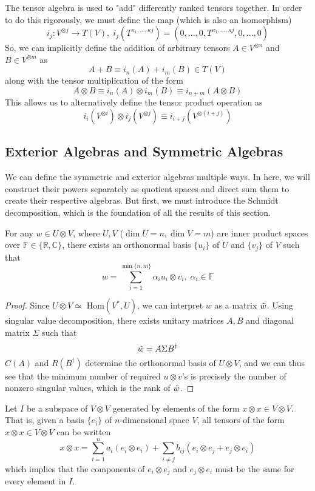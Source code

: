   The tensor algebra is used to "add" differently ranked tensors together. In order to do this rigorously, we must define the map (which is also an isomorphism)
  \[i_j: V^{\otimes j} \longrightarrow T(V), \; i_j (T^{\kappa_1, ..., \kappa j}) = (0, ...,0, T^{\kappa_1, ..., \kappa j}, 0, ..., 0) \]
  So, we can implicitly define the addition of arbitrary tensors $A \in V^{\otimes n}$ and $B \in V^{\otimes m}$ as 
  \[ A + B \equiv i_n (A) + i_m (B) \in T(V)\]
  along with the tensor multiplication of the form
  \[ A \otimes B \equiv i_n(A) \otimes i_m(B) \equiv i_{n+m} (A \otimes B)\]
  This allows us to alternatively define the tensor product operation as
  \[i_i(V^{\otimes i}) \otimes i_j( V^{\otimes j}) \equiv i_{i+j} (V^{\otimes (i+j)})\]

\subsection{Exterior Algebras and Symmetric Algebras}

  We can define the symmetric and exterior algebras multiple ways. In here, we will construct their powers separately as quotient spaces and direct sum them to create their respective algebras. But first, we must introduce the Schmidt decomposition, which is the foundation of all the results of this section. 

  \begin{theorem}
  For any $w \in U \otimes V$, where $U, V$ ($\dim{U} = n, \dim{V} = m$)  are inner product spaces over $\mathbb{F} \in \{ \mathbb{R}, \mathbb{C}\}$, there exists an orthonormal basis $\{u_i\}$ of $U$ and $\{v_j\}$ of $V$ such that 
  \[ w = \sum_{i=1}^{\min{\{n, m\}}} \alpha_i u_i \otimes v_i, \; \alpha_i \in \mathbb{F}\]
  \end{theorem}
  \begin{proof}
  Since $U \otimes V \simeq $ Hom$(V^*, U)$, we can interpret $w$ as a matrix $\Tilde{w}$. Using singular value decomposition, there exists unitary matrices $A, B$ and diagonal matrix $\Sigma$ such that
  \[\Tilde{w} = A \Sigma B^\dagger\]
  $C(A)$ and $R(B^\dagger)$ determine the orthonormal basis of $U \otimes V$, and we can thus see that the minimum number of required $u \otimes v$'s is precisely the number of nonzero singular values, which is the rank of $\Tilde{w}$. 

  \end{proof}

  \begin{definition}
  Let $I$ be a subspace of $V \otimes V$ generated by elements of the form $x \otimes x \in V \otimes V$. That is, given a basis $\{e_i\}$ of $n$-dimensional space $V$, all tensors of the form $x \otimes x \in V \otimes V$ can be written 
  \[x \otimes x = \sum_{i=1}^n a_i (e_i \otimes e_i) + \sum_{i \neq j} b_{i j} (e_i \otimes e_j + e_j \otimes e_i)\]
  which implies that the components of $e_i \otimes e_j$ and $e_j \otimes e_i$ must be the same for every element in $I$. 
  \end{definition}

